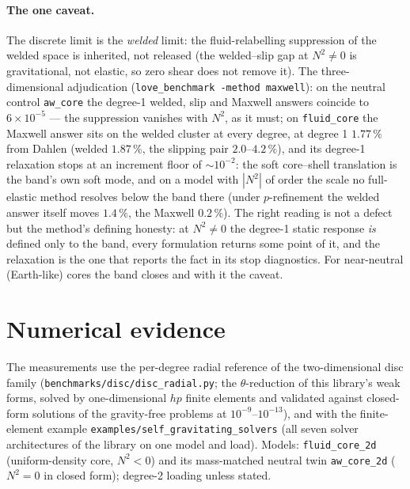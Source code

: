 \documentclass[11pt]{article}
\newcommand{\code}[1]{\texttt{#1}}
\begin{document}
\paragraph{The one caveat.} The discrete limit is the
\emph{welded} limit: the fluid-relabelling suppression of the welded
space is inherited, not released (the welded--slip gap at
$N^2 \ne 0$ is gravitational, not elastic, so zero shear does not
remove it). The three-dimensional adjudication
(\code{love\_benchmark -method maxwell}): on the neutral
control \code{aw\_core} the degree-1 welded, slip and Maxwell
answers coincide to $6\times10^{-5}$ --- the suppression vanishes
with $N^2$, as it must; on \code{fluid\_core} the Maxwell answer
sits on the welded cluster at every degree, at degree 1
$1.77\,\%$ from Dahlen (welded $1.87\,\%$, the slipping pair
$2.0$--$4.2\,\%$), and its degree-1 relaxation stops at an
increment floor of $\sim10^{-2}$: the soft core--shell translation
is the band's own soft mode, and on a model with $|N^2|$ of order
the scale no full-elastic method resolves below the band there
(under $p$-refinement the welded answer itself moves $1.4\,\%$, the
Maxwell $0.2\,\%$). The right reading is not a defect but the
method's defining honesty: at $N^2 \ne 0$ the degree-1 static
response \emph{is} defined only to the band, every formulation
returns some point of it, and the relaxation is the one that reports
the fact in its stop diagnostics. For near-neutral (Earth-like)
cores the band closes and with it the caveat.

\section{Numerical evidence}
\label{sec:evidence}

The measurements use the per-degree radial reference
of the two-dimensional disc family
(\code{benchmarks/disc/disc\_radial.py}; the $\theta$-reduction of
this library's weak forms, solved by one-dimensional $hp$ finite
elements and validated against closed-form solutions of the
gravity-free problems at $10^{-9}$--$10^{-13}$), and with the
finite-element example \code{examples/self\_gravitating\_solvers}
(all seven solver architectures of the library on one model and load).
Models: \code{fluid\_core\_2d} (uniform-density core, $N^2 < 0$) and
its mass-matched neutral twin \code{aw\_core\_2d} ($N^2 = 0$ in
closed form); degree-2 loading unless stated.
\end{document}
